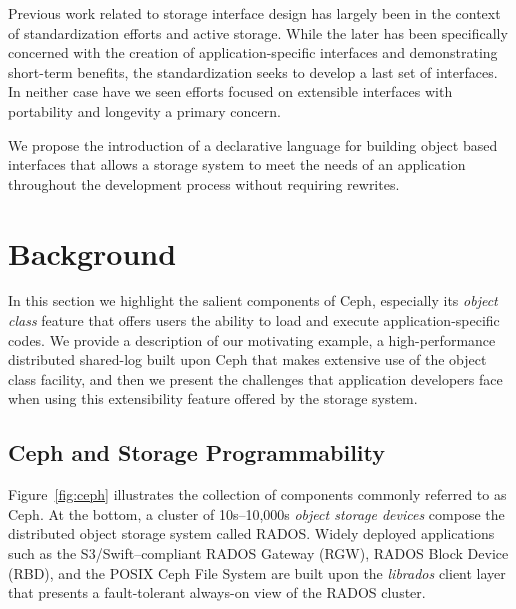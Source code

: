 \documentclass[10pt,twocolumn]{article}
\begin{document}
Previous work related to storage interface design has largely been in the
context of standardization efforts and active storage. While the later has
been specifically concerned with the creation of application-specific
interfaces and demonstrating short-term benefits, the standardization seeks to
develop a last set of interfaces. In neither case have we seen efforts focused
on extensible interfaces with portability and longevity a primary concern.


We propose the introduction of a declarative language for building object
based interfaces that allows a storage system to meet the needs of an
application throughout the development process without requiring rewrites.

\section{Background}

In this section we highlight the salient components of Ceph, especially its
\emph{object class} feature that offers users the ability to load and execute
application-specific codes. We provide a description of our motivating
example, a high-performance distributed shared-log built upon Ceph that makes
extensive use of the object class facility, and then we present the challenges
that application developers face when using this extensibility feature offered
by the storage system.

\subsection{Ceph and Storage Programmability}
\label{sec:objclass}

Figure~\ref{fig:ceph} illustrates the collection of components commonly
referred to as Ceph. At the bottom, a cluster of 10s--10,000s \emph{object
storage devices} compose the distributed object storage system called RADOS.
Widely deployed applications such as the S3/Swift--compliant RADOS Gateway
(RGW), RADOS Block Device (RBD), and the POSIX Ceph File System are built upon
the \emph{librados} client layer that presents a fault-tolerant always-on view
of the RADOS cluster.
\end{document}
